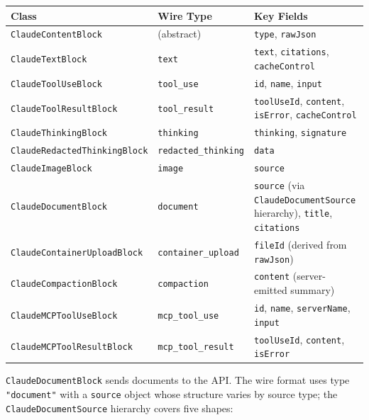 \documentclass[a4paper,10pt,fleqn]{article}
\newcommand{\cls}[1]{\texttt{#1}}
\begin{document}
\begin{center}
\small
\begin{tabular}{@{}llp{6.2cm}@{}}
\toprule
\textbf{Class} & \textbf{Wire Type} & \textbf{Key Fields} \\
\midrule
\cls{ClaudeContentBlock}            & (abstract)        & \texttt{type}, \texttt{rawJson} \\
\cls{ClaudeTextBlock}               & \texttt{text}     & \texttt{text}, \texttt{citations}, \texttt{cacheControl} \\
\cls{ClaudeToolUseBlock}            & \texttt{tool\_use} & \texttt{id}, \texttt{name}, \texttt{input} \\
\cls{ClaudeToolResultBlock}         & \texttt{tool\_result} & \texttt{toolUseId}, \texttt{content}, \texttt{isError}, \texttt{cacheControl} \\
\cls{ClaudeThinkingBlock}           & \texttt{thinking} & \texttt{thinking}, \texttt{signature} \\
\cls{ClaudeRedactedThinkingBlock}   & \texttt{redacted\_thinking} & \texttt{data} \\
\cls{ClaudeImageBlock}              & \texttt{image}    & \texttt{source} \\
\cls{ClaudeDocumentBlock}           & \texttt{document} & \texttt{source} (via \cls{ClaudeDocumentSource} hierarchy), \texttt{title}, \texttt{citations} \\
\cls{ClaudeContainerUploadBlock}    & \texttt{container\_upload} & \texttt{fileId} (derived from \texttt{rawJson}) \\
\cls{ClaudeCompactionBlock}         & \texttt{compaction} & \texttt{content} (server-emitted summary) \\
\cls{ClaudeMCPToolUseBlock}         & \texttt{mcp\_tool\_use} & \texttt{id}, \texttt{name}, \texttt{serverName}, \texttt{input} \\
\cls{ClaudeMCPToolResultBlock}      & \texttt{mcp\_tool\_result} & \texttt{toolUseId}, \texttt{content}, \texttt{isError} \\
\bottomrule
\end{tabular}
\end{center}

\cls{ClaudeDocumentBlock} sends documents to the API.  The wire
format uses type \texttt{"document"} with a \texttt{source}
object whose structure varies by source type; the
\cls{ClaudeDocumentSource} hierarchy covers five shapes:
\end{document}
